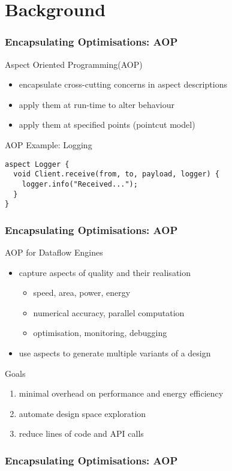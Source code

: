 \section{Background}

\begin{frame}[fragile]
  \frametitle{Encapsulating Optimisations: AOP}
  \begin{beamerboxesrounded}{Aspect Oriented Programming(AOP)}
    \begin{itemize}
      \item encapsulate cross-cutting concerns in aspect descriptions
      \item apply them at run-time to alter behaviour
      \item apply them at specified points (pointcut model)
    \end{itemize}
  \end{beamerboxesrounded}
\vspace{0.75cm}
\begin{beamerboxesrounded}{AOP Example: Logging}
\vspace{-0.5cm}
  \begin{lstlisting}[label=lst:label]
aspect Logger {
  void Client.receive(from, to, payload, logger) {
    logger.info("Received...");
  }
}
\end{lstlisting}
\end{beamerboxesrounded}


\end{frame}

\begin{frame}[fragile]
  \frametitle{Encapsulating Optimisations: AOP}
  \begin{beamerboxesrounded}{AOP for Dataflow Engines}
    \begin{itemize}
      \item capture aspects of quality and their realisation
        \begin{itemize}
          \item speed, area, power, energy
          \item numerical accuracy, parallel computation
          \item optimisation, monitoring, debugging
        \end{itemize}
      \item use aspects to generate multiple variants of a design
    \end{itemize}
  \end{beamerboxesrounded}
  \begin{beamerboxesrounded}{Goals}
    \begin{enumerate}
      \item minimal overhead on performance and energy efficiency
      \item automate design space exploration
      \item reduce lines of code and API calls
    \end{enumerate}
  \end{beamerboxesrounded}

\end{frame}

\begin{frame}[fragile]
  \frametitle{Encapsulating Optimisations: AOP}
  \begin{figure}[!ht]
  \centering
  \def\svgwidth{\textwidth}
  
\end{figure}
\end{frame}
